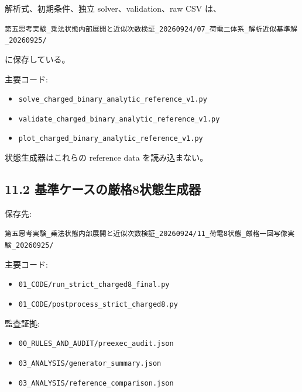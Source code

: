 \documentclass[
  a4paper,
]{ltjsarticle}
\providecommand{\tightlist}{%
  \setlength{\itemsep}{0pt}\setlength{\parskip}{0pt}}
\begin{document}
解析式、初期条件、独立 solver、validation、raw CSV は、

\texttt{第五思考実験\_\allowbreak{}乗法状態内部展開と近似次数検証\_\allowbreak{}20260924/\allowbreak{}07\_\allowbreak{}荷電二体系\_\allowbreak{}解析近似基準解\_\allowbreak{}20260925/\allowbreak{}}

に保存している。

主要コード:

\begin{itemize}
\tightlist
\item
  \texttt{solve\_charged\_binary\_analytic\_reference\_v1.py}
\item
  \texttt{validate\_charged\_binary\_analytic\_reference\_v1.py}
\item
  \texttt{plot\_charged\_binary\_analytic\_reference\_v1.py}
\end{itemize}

状態生成器はこれらの reference data を読み込まない。

\subsection{11.2
基準ケースの厳格8状態生成器}\label{ux57faux6e96ux30b1ux30fcux30b9ux306eux53b3ux683c8ux72b6ux614bux751fux6210ux5668}

保存先:

\texttt{第五思考実験\_\allowbreak{}乗法状態内部展開と近似次数検証\_\allowbreak{}20260924/\allowbreak{}11\_\allowbreak{}荷電8状態\_\allowbreak{}厳格一回写像実験\_\allowbreak{}20260925/\allowbreak{}}

主要コード:

\begin{itemize}
\tightlist
\item
  \texttt{01\_\allowbreak{}CODE/\allowbreak{}run\_\allowbreak{}strict\_\allowbreak{}charged8\_\allowbreak{}final.py}
\item
  \texttt{01\_\allowbreak{}CODE/\allowbreak{}postprocess\_\allowbreak{}strict\_\allowbreak{}charged8.py}
\end{itemize}

監査証拠:

\begin{itemize}
\tightlist
\item
  \texttt{00\_\allowbreak{}RULES\_\allowbreak{}AND\_\allowbreak{}AUDIT/\allowbreak{}preexec\_\allowbreak{}audit.json}
\item
  \texttt{03\_\allowbreak{}ANALYSIS/\allowbreak{}generator\_\allowbreak{}summary.json}
\item
  \texttt{03\_\allowbreak{}ANALYSIS/\allowbreak{}reference\_\allowbreak{}comparison.json}
\end{itemize}
\end{document}
